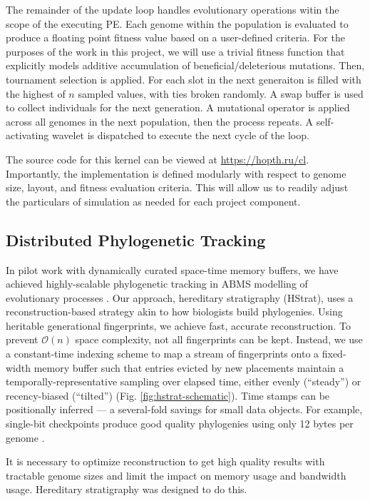 The remainder of the update loop handles evolutionary operations witin the scope of the executing PE.
Each genome within the population is evaluated to produce a floating point fitness value based on a user-defined criteria.
For the purposes of the work in this project, we will use a trivial fitness function that explicitly models additive accumulation of beneficial/deleterious mutations.
Then, tournament selection is applied.
For each slot in the next generaiton is filled with the highest of $n$ sampled values, with ties broken randomly.
A swap buffer is used to collect individuals for the next generation.
A mutational operator is applied across all genomes in the next population, then the process repeats.
A self-activating wavelet is dispatched to execute the next cycle of the loop.

The source code for this kernel can be viewed at \url{https://hopth.ru/cl}.
Importantly, the implementation is defined modularly with respect to genome size, layout, and fitness evaluation criteria.
This will allow us to readily adjust the particulars of simulation as needed for each project component.

\subsection{Distributed Phylogenetic Tracking}

In pilot work with dynamically curated space-time memory buffers, we have achieved highly-scalable phylogenetic tracking in ABMS modelling of evolutionary processes \citep{morenoHstratPythonPackage2022, morenoHereditaryStratigraphyGenome2022}.
Our approach, hereditary stratigraphy (HStrat), uses a reconstruction-based strategy akin to how biologists build phylogenies.
Using heritable generational fingerprints, we achieve fast, accurate reconstruction.
To prevent $\mathcal{O}(n)$ space complexity, not all fingerprints can be kept.
Instead, we use a constant-time indexing scheme to map a stream of fingerprints onto a fixed-width memory buffer such that entries evicted by new placements maintain a temporally-representative sampling over elapsed time, either evenly (``steady'') or recency-biased (``tilted'') (Fig. \ref{fig:hstrat-schematic}).
Time stamps can be positionally inferred  --- a several-fold savings for small data objects. For example, single-bit checkpoints produce good quality phylogenies using only 12 bytes per genome \citep{moreno2023toward}.

It is necessary to optimize reconstruction to get high quality results with tractable genome sizes and limit the impact on memory usage and bandwidth usage.
Hereditary stratigraphy \citep{moreno2022hereditary} was designed to do this.

